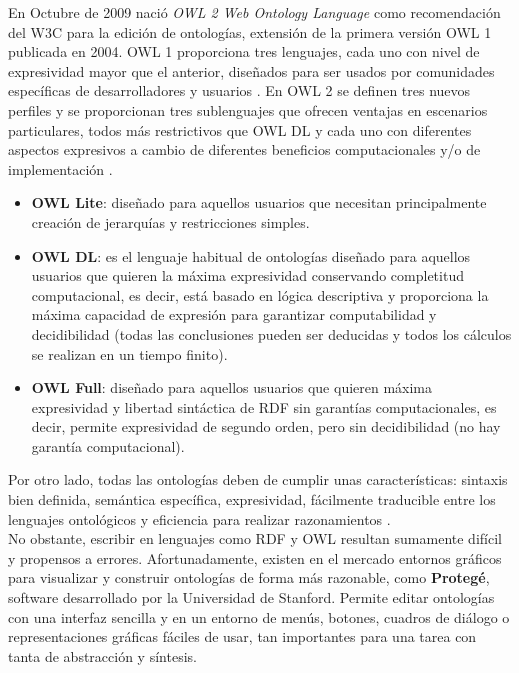 En Octubre de 2009 nació \textit{OWL 2 Web Ontology Language} como recomendación del W3C para la edición de ontologías, extensión de la primera versión OWL 1 publicada en 2004. OWL 1 proporciona tres lenguajes, cada uno con nivel de expresividad mayor que el anterior, diseñados para ser usados por comunidades específicas de desarrolladores y usuarios \cite{owl-tipos}. En OWL 2 se definen tres nuevos perfiles y se proporcionan tres sublenguajes que ofrecen ventajas en escenarios particulares, todos más restrictivos que OWL DL y cada uno con diferentes aspectos expresivos a cambio de diferentes beneficios computacionales y/o de implementación \cite{aplicacion}. 

\begin{itemize}
	\item \textbf{OWL Lite}: diseñado para aquellos usuarios que necesitan principalmente creación de jerarquías y restricciones simples.
	
	\item \textbf{OWL DL}: es el lenguaje habitual de ontologías diseñado para aquellos usuarios que quieren la máxima expresividad conservando completitud computacional, es decir, está basado en lógica descriptiva y proporciona la máxima capacidad de expresión para garantizar computabilidad y decidibilidad (todas las conclusiones pueden ser deducidas y todos los cálculos se realizan en un tiempo finito).
	
	\item \textbf{OWL Full}: diseñado para aquellos usuarios que quieren máxima expresividad y libertad sintáctica de RDF sin garantías computacionales, es decir, permite expresividad de segundo orden, pero sin decidibilidad (no hay garantía computacional).
\end{itemize}

Por otro lado, todas las ontologías deben de cumplir unas características: sintaxis bien definida, semántica específica, expresividad, fácilmente traducible entre los lenguajes ontológicos y eficiencia para realizar razonamientos \cite{apuntes-clase-jose}.\\

No obstante, escribir en lenguajes como RDF y OWL resultan sumamente difícil y propensos a errores. Afortunadamente, existen en el mercado entornos gráficos para visualizar y construir ontologías de forma más razonable, como \textbf{Protegé}, software desarrollado por la Universidad de Stanford. Permite editar ontologías con una interfaz sencilla y en un entorno de menús, botones, cuadros de diálogo o representaciones gráficas fáciles de usar, tan importantes para una tarea con tanta de abstracción y síntesis.

